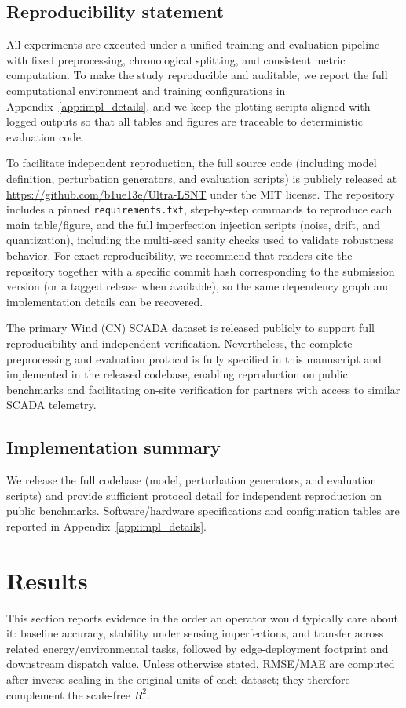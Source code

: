 \documentclass[review,3p,times]{elsarticle}
\begin{document}
\subsection{Reproducibility statement}
All experiments are executed under a unified training and evaluation pipeline with fixed preprocessing, chronological splitting, and consistent metric computation. To make the study reproducible and auditable, we report the full computational environment and training configurations in Appendix~\ref{app:impl_details}, and we keep the plotting scripts aligned with logged outputs so that all tables and figures are traceable to deterministic evaluation code.

To facilitate independent reproduction, the full source code (including model definition, perturbation generators, and evaluation scripts) is publicly released at \url{https://github.com/b1ue13e/Ultra-LSNT} under the MIT license. The repository includes a pinned \texttt{requirements.txt}, step-by-step commands to reproduce each main table/figure, and the full imperfection injection scripts (noise, drift, and quantization), including the multi-seed sanity checks used to validate robustness behavior. For exact reproducibility, we recommend that readers cite the repository together with a specific commit hash corresponding to the submission version (or a tagged release when available), so the same dependency graph and implementation details can be recovered.

The primary Wind (CN) SCADA dataset is released publicly to support full reproducibility and independent verification. Nevertheless, the complete preprocessing and evaluation protocol is fully specified in this manuscript and implemented in the released codebase, enabling reproduction on public benchmarks and facilitating on-site verification for partners with access to similar SCADA telemetry.

\subsection{Implementation summary}
We release the full codebase (model, perturbation generators, and evaluation scripts) and provide sufficient protocol detail for independent reproduction on public benchmarks. Software/hardware specifications and configuration tables are reported in Appendix~\ref{app:impl_details}.

\section{Results}
\label{sec:results}
This section reports evidence in the order an operator would typically care about it: baseline accuracy, stability under sensing imperfections, and transfer across related energy/environmental tasks, followed by edge-deployment footprint and downstream dispatch value. Unless otherwise stated, RMSE/MAE are computed after inverse scaling in the original units of each dataset; they therefore complement the scale-free $R^2$.
\end{document}
